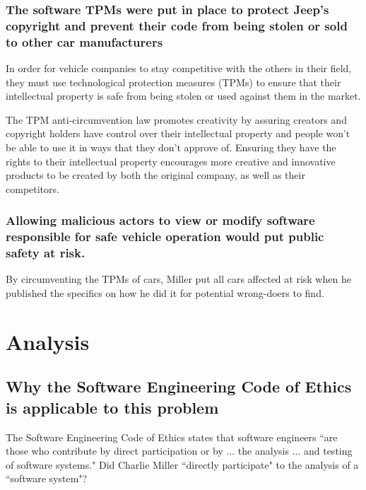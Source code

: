 \documentclass[12pt]{article}
\begin{document}
\begin{multicols}{2}
\subsubsection{The software TPMs were put in place to protect Jeep's copyright and prevent their code from being stolen or sold to other car manufacturers}

In order for vehicle companies to stay competitive with the others in their field, they must use technological protection measures (TPMs) to ensure that their intellectual property is safe from being stolen or used against them in the market. 

The TPM anti-circumvention law promotes creativity by assuring creators and copyright holders have control over their intellectual property and people won't be able to use it in ways that they don't approve of.\cite{chris} Ensuring they have the rights to their intellectual property encourages more creative and innovative products to be created by both the original company, as well as their competitors. \cite{chris}
 
\subsubsection{Allowing malicious actors to view or modify software responsible for safe vehicle operation would put public safety at risk.}

By circumventing the TPMs of cars, Miller put all cars affected at risk when he published the specifics on how he did it\cite{officialPaper} for potential wrong-doers to find.

\section{Analysis}

\subsection{Why the Software Engineering Code of Ethics is applicable to this problem}

The Software Engineering Code of Ethics states that software engineers ``are those who contribute by direct participation or by ... the analysis ... and testing of software systems."\cite{seCode} Did Charlie Miller ``directly participate" to the analysis of a ``software system"?


\end{multicols}
\end{document}
